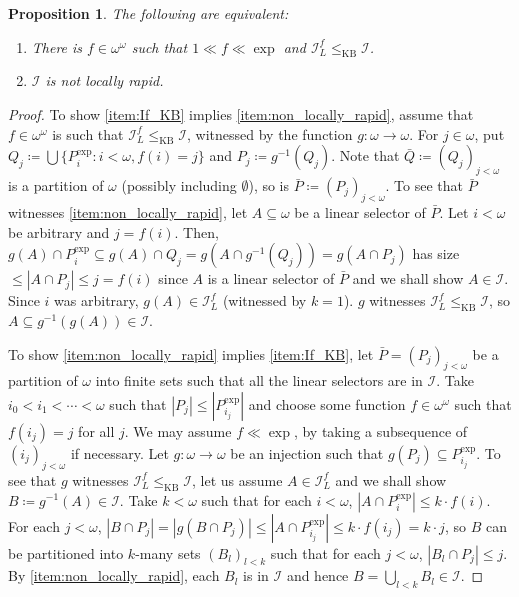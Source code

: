 \documentclass[a4paper,12pt]{amsart}
\newtheorem{prop}[thm]{Proposition}
\theoremstyle{definition}
\numberwithin{thm}{section}
\numberwithin{equation}{section}
\newcommand{\oo}{{\omega}^\omega}
\newcommand{\I}{\mathscr{I}}
\newcommand{\IL}{\I_{L}}
\begin{document}
    \begin{prop}\label{prop:chara_f_growth}
        The following are equivalent:
        \begin{enumerate}
            \item There is $f\in\oo$ such that $1\ll f\ll\exp$ and $\IL^f\leq_{\mathrm{KB}} \I$. \label{item:If_KB}
            \item $\I$ is not locally rapid. 
            \label{item:non_locally_rapid}
        \end{enumerate}
    \end{prop}
    \begin{proof}
        To show \eqref{item:If_KB} implies \eqref{item:non_locally_rapid}, assume that $f\in\oo$ is such that $\IL^f\leq_{\mathrm{KB}} \I$, witnessed by the function $g\colon\omega\to\omega$. For $j\in\omega$, put $Q_j\coloneqq\bigcup\{P_i^\mathrm{exp}:i<\omega,f(i)=j\}$ and $P_j\coloneqq g^{-1}(Q_j)$. Note that $\bar{Q}\coloneqq(Q_j)_{j<\omega}$ is a partition of $\omega$ (possibly including $\emptyset$), so is $\bar{P}\coloneqq(P_j)_{j<\omega}$. To see that $\bar{P}$ witnesses \eqref{item:non_locally_rapid}, let $A\subseteq\omega$ be a linear selector of $\bar{P}$.
        Let $i<\omega$ be arbitrary and $j=f(i)$.
        Then, $g(A)\cap P_i^\mathrm{exp}\subseteq g(A)\cap Q_j=g(A\cap g^{-1}(Q_j))=g(A\cap P_j)$ has size $\leq|A\cap P_j|\leq j=f(i)$ since $A$ is a linear selector of $\bar{P}$ and we shall show $A\in\I$. Since $i$ was arbitrary, $g(A)\in\IL^f$ (witnessed by $k=1$). $g$ witnesses $\IL^f\leq_{\mathrm{KB}} \I$, so $A\subseteq g^{-1}(g(A))\in\I$.
        
    	To show \eqref{item:non_locally_rapid} implies \eqref{item:If_KB}, let $\bar{P}=(P_j)_{j<\omega}$ be a partition of $\omega$ into finite sets such that all the linear selectors are in $\I$. Take $i_0<i_1<\cdots<\omega$ such that $|P_j|\leq|P_{i_j}^\mathrm{exp}|$ and choose some function $f\in\oo$ such that $f(i_j)=j$ for all $j$. We may assume $f\ll\exp$, by taking a subsequence of $(i_j)_{j<\omega}$ if necessary. Let $g\colon\omega\to\omega$ be an injection such that $g(P_j)\subseteq P^\mathrm{exp}_{i_j}$. To see that $g$ witnesses $\IL^f\leq_{\mathrm{KB}} \I$, let us assume $A\in \IL^f$ and we shall show $B\coloneqq g^{-1}(A)\in\I$. Take $k<\omega$ such that for each $i<\omega$, $|A\cap P_i^\mathrm{exp}|\leq k\cdot f(i)$. For each $j<\omega$, $|B\cap P_j |=|g(B\cap P_j)|\leq |A\cap P_{i_j}^\mathrm{exp}|\leq k\cdot f(i_j)=k\cdot j$, so $B$ can be partitioned into $k$-many sets $(B_l)_{l<k}$ such that for each $j<\omega$, $|B_l\cap P_j |\leq j$. By \eqref{item:non_locally_rapid}, each $B_l$ is in $\I$ and hence $B=\bigcup_{l<k}B_l\in\I$.
    \end{proof}
    
\end{document}
